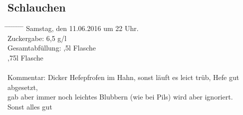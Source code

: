 \documentclass[12pt,oneside,a4paper]{scrartcl}
\begin{document}
{\subsection*{Schlauchen}
	\begin{tabbing}
		\hspace{1cm} \= \hspace{1cm} \= \hspace{1cm} \= \hspace{1cm} \= \hspace{1cm} \= \hspace{1cm} \= \hspace{1cm} \= \hspace{1cm} \= \kill
		\> Samstag, den 11.06.2016 um 22 Uhr.\\
		\> Zuckergabe: 6,5 g/l\\
		\> Gesamtabfüllung: \> \> \>  ,5l Flasche\\
		\> \> \> \>  ,75l Flasche\\
		\\
		\> Kommentar: \>\>\> Dicker Hefepfrofen im Hahn, sonst läuft es leict trüb, Hefe gut abgesetzt,\\
		\> \> \> \> gab aber immer noch leichtes Blubbern (wie bei Pils) wird aber ignoriert.\\
		\> \> \> \> Sonst alles gut
	\end{tabbing}
%
}
\end{document}
